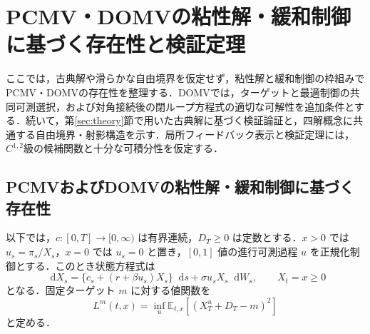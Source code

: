 \documentclass[10pt,a4paper]{article}
\theoremstyle{plain}
\theoremstyle{definition}
\newcommand{\E}{\mathbb{E}}
\newcommand{\dd}{\mathop{}\!\mathrm{d}}
\begin{document}
\section{PCMV・DOMVの粘性解・緩和制御に基づく存在性と検証定理}
\label{app:technical-proofs}
ここでは，古典解や滑らかな自由境界を仮定せず，粘性解と緩和制御の枠組みでPCMV・DOMVの存在性を整理する．DOMVでは，ターゲットと最適制御の共同可測選択，および対角接続後の閉ループ方程式の適切な可解性を追加条件とする．続いて，第\ref{sec:theory}節で用いた古典解に基づく検証論証と，四解概念に共通する自由境界・射影構造を示す．局所フィードバック表示と検証定理には，$C^{1,2}$級の候補関数と十分な可積分性を仮定する．

\subsection{PCMVおよびDOMVの粘性解・緩和制御に基づく存在性}
\label{app:pcmv-domv-existence}

以下では，$c:[0,T]\to[0,\infty)$ は有界連続，$D_T\geq0$ は定数とする．$x>0$ では $u_s=\pi_s/X_s$，$x=0$ では $u_s=0$ と置き，$[0,1]$ 値の進行可測過程 $u$ を正規化制御とする．このとき状態方程式は
\begin{equation}
 \dd X_s=\{c_s+(r+\beta u_s)X_s\}\dd s+\sigma u_sX_s\dd W_s,
 \qquad X_t=x\geq0
 \label{eq:normalized-controlled-state}
\end{equation}
となる．固定ターゲット $m$ に対する値関数を
\begin{equation}
 L^m(t,x)=\inf_{u}\E_{t,x}\!\left[(X_T^u+D_T-m)^2\right]
 \label{eq:app-weak-value}
\end{equation}
と定める．
\end{document}
